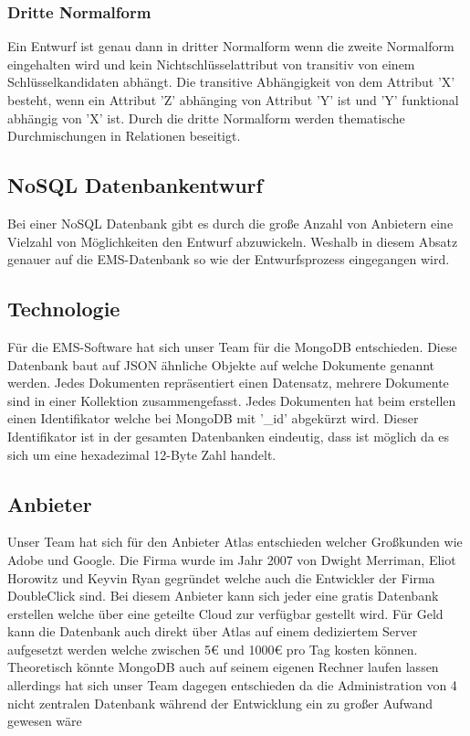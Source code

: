 			\subsubsection*{Dritte Normalform}
				Ein Entwurf ist genau dann in dritter Normalform wenn die zweite Normalform eingehalten wird und kein Nichtschlüsselattribut von transitiv von einem Schlüsselkandidaten abhängt. 
				Die transitive Abhängigkeit von dem Attribut 'X' besteht, wenn ein Attribut 'Z' abhänging von Attribut 'Y' ist und 'Y' funktional abhängig von 'X' ist. 
				Durch die dritte Normalform werden thematische Durchmischungen in Relationen beseitigt. 
			
		\subsection{NoSQL Datenbankentwurf}
			Bei einer NoSQL Datenbank gibt es durch die große Anzahl von Anbietern eine Vielzahl von Möglichkeiten den Entwurf abzuwickeln. 
			Weshalb in diesem Absatz genauer auf die EMS-Datenbank so wie der Entwurfsprozess eingegangen wird. 
			
			\subsection{Technologie}
			Für die EMS-Software hat sich unser Team für die MongoDB entschieden. Diese Datenbank baut auf JSON ähnliche Objekte auf welche Dokumente genannt werden. 
			Jedes Dokumenten repräsentiert einen Datensatz, mehrere Dokumente sind in einer Kollektion zusammengefasst. 
			Jedes Dokumenten hat beim erstellen einen Identifikator welche bei MongoDB mit '\_id' abgekürzt wird. 
			Dieser Identifikator ist in der gesamten Datenbanken eindeutig, dass ist möglich da es sich um eine hexadezimal 12-Byte Zahl handelt. 

			\subsection{Anbieter}
			Unser Team hat sich für den Anbieter Atlas entschieden welcher Großkunden wie Adobe und Google. Die Firma wurde im Jahr 2007 von Dwight Merriman, Eliot Horowitz und Keyvin Ryan gegründet welche auch die Entwickler der Firma DoubleClick sind. 
			Bei diesem Anbieter kann sich jeder eine gratis Datenbank erstellen welche über eine geteilte Cloud zur verfügbar gestellt wird. 
			Für Geld kann die Datenbank auch direkt über Atlas auf einem dediziertem Server aufgesetzt werden welche zwischen 5€ und 1000€ pro Tag kosten können. 
			Theoretisch könnte MongoDB auch auf seinem eigenen Rechner laufen lassen allerdings hat sich unser Team dagegen entschieden da die Administration von 4 nicht zentralen Datenbank während der Entwicklung ein zu großer Aufwand gewesen wäre
		
